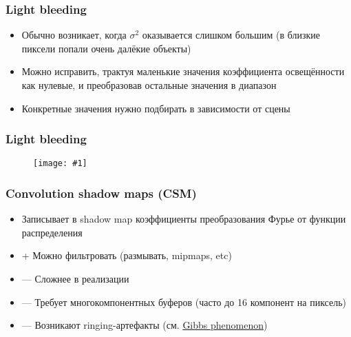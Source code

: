 \documentclass{beamer}
\newcommand{\slideimage}[1]{
  \begin{figure}
    \begin{adjustbox}{width=\textwidth, totalheight=\textheight-2\baselineskip-2\baselineskip,keepaspectratio}
      \texttt{[image: \#1]}
    \end{adjustbox}
  \end{figure}
}
\begin{document}
\begin{frame}[fragile]
\frametitle{Light bleeding}
\begin{itemize}
\item Обычно возникает, когда \begin{math}\sigma^2\end{math} оказывается слишком большим (в близкие пиксели попали очень далёкие объекты)
\pause
\item Можно исправить, трактуя маленькие значения коэффициента освещённости как нулевые, и преобразовав остальные значения в диапазон \begin{math}[0, 1]\end{math}
\pause
\item Конкретные значения нужно подбирать в зависимости от сцены
\end{itemize}
\end{frame}

\begin{frame}[fragile]
\frametitle{Light bleeding}
\slideimage{light_bleeding_scheme.jpg}
\end{frame}

\begin{frame}[fragile]
\frametitle{Convolution shadow maps (CSM)}
\begin{itemize}
\item Записывает в shadow map коэффициенты преобразования Фурье от функции распределения
\pause
\item {\color{green}+} Можно фильтровать (размывать, mipmaps, etc)
\item {\color{red}—} Сложнее в реализации
\item {\color{red}—} Требует многокомпонентных буферов (часто до 16 компонент на пиксель)
\item {\color{red}—} Возникают ringing-артефакты (см. \href{https://en.wikipedia.org/wiki/Gibbs_phenomenon}{Gibbs phenomenon})
\end{itemize}
\end{frame}
\end{document}
